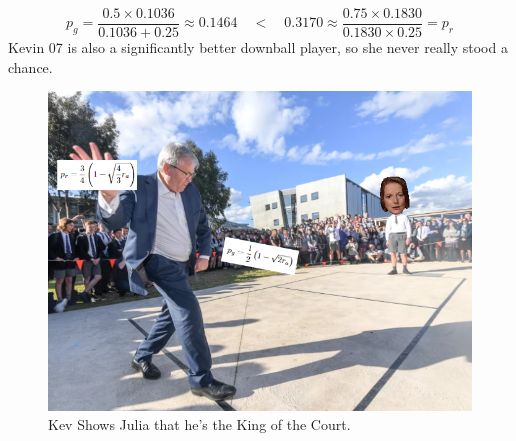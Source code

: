 \documentclass{article}
\begin{document}
$$p_{g} = \frac{0.5 \times 0.1036}{0.1036 + 0.25} \approx 0.1464 \quad < \quad 0.3170 \approx \frac{0.75 \times 0.1830}{0.1830 \times 0.25} = p_{r}$$
\newpage
\vspace*{\fill}
\centering
Kevin 07 is also a significantly better downball player, so she never really stood a chance.
\begin{figure}[hb]
    \centering
    \includegraphics[width=0.75\linewidth]{handball}
    \caption{Kev Shows Julia that he's the King of the Court.}
    \label{fig:handball}
\end{figure}
\vspace*{\fill}
\end{document}
